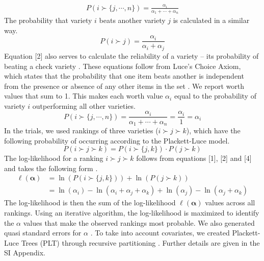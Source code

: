 \documentclass[9pt,twocolumn,twoside]{pnas-new}
\begin{document}
{\begin{equation} \begin{aligned}P ( i \succ \{ j , \cdots, n \} ) = \frac { \alpha _ { i } } { \alpha _ { 1 } + \cdots + \alpha _ { n } }\end{aligned} \end{equation}
The probability that variety $i$ beats another variety $j$ is calculated in a similar way.
\begin{equation} P ( i \succ j ) = \frac { \alpha _ { i } } {\alpha _ { i } + \alpha _ { j } }\end{equation}
Equation [2] also serves to calculate the reliability of a variety -- its probability of beating a check variety \cite{eskridge1992choosing}. These equations follow from Luce’s Choice Axiom, which states that the probability that one item beats another is independent from the presence or absence of any other items in the set \cite{luce1959individual}. We report worth values that sum to 1. This makes each worth value $\alpha_i$ equal to the probability of variety $i$ outperforming all other varieties. 
\begin{equation} P ( i \succ \{ j , \cdots, n \} ) = \frac { \alpha _ { i } } { \alpha _ { 1 } + \cdots + \alpha _ { n } } = \frac { \alpha _ { i } } { 1 } = \alpha _ { i }\end{equation}
In the trials, we used rankings of three varieties ($i \succ j \succ k$), which have the following probability of occurring according to the Plackett-Luce model.
\begin{equation} P ( i \succ j \succ k ) = P ( i \succ \{ j , k \} ) \cdot P ( j \succ k ) \end{equation}
The log-likelihood for a ranking $i \succ j \succ k$ follows from equations [1], [2] and [4] and takes the following form \cite{hunter2004mm}.
\begin{equation} \begin{aligned} \ell ( \boldsymbol { \alpha } ) & = \ln ( P ( i \succ \{ j , k \} ) ) + \ln ( P ( j \succ k ) ) \\ & = \ln \left( \alpha _ { i } \right) - \ln \left( \alpha _ { i } + \alpha _ { j } + \alpha _ { k } \right) + \ln \left( \alpha _ { j } \right) - \ln \left( \alpha _ { j } + \alpha _ { k } \right) \end{aligned} \end{equation}
The log-likelihood is then the sum of the log-likelihood $\ell ( \boldsymbol { \alpha } )$ values across all rankings. Using an iterative algorithm, the log-likelihood is maximized to identify the $\alpha$ values that make the observed rankings most probable. We also generated quasi standard errors for $\alpha$ \cite{turner2018modelling}. To take into account covariates, we created Plackett-Luce Trees (PLT) through recursive partitioning \cite{strobl2011accounting}. Further details are given in the SI Appendix.

}
\end{document}
